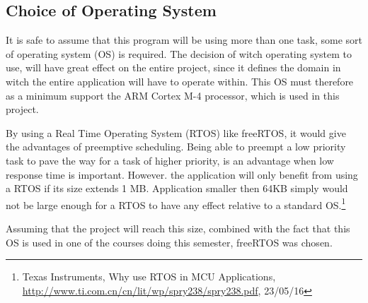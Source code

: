 \subsection{Choice of Operating System}
\label{sec:ChoiceofOperatingSystem}

It is safe to assume that this program will be using more than one task, some sort of operating system (OS) is required. The decision of witch operating system to use, will have great effect on the entire project, since it defines the domain in witch the entire application will have to operate within. This OS must therefore as a minimum support the ARM Cortex M-4 processor, which is used in this project. 

By using a Real Time Operating System (RTOS) like freeRTOS, it would give the advantages of preemptive scheduling. Being able to preempt a low priority task to pave the way for a task of higher priority, is an advantage when low response time is important. However. the application will only benefit from using a RTOS if its size extends 1 MB. Application smaller then 64KB simply would not be large enough for a RTOS to have any effect relative to a standard OS.\footnote{Texas Instruments, Why use RTOS in MCU Applications, \url{http://www.ti.com.cn/cn/lit/wp/spry238/spry238.pdf}, 23/05/16}

Assuming that the project will reach this size, combined with the fact that this OS is used in one of the courses doing this semester, freeRTOS was chosen.



 